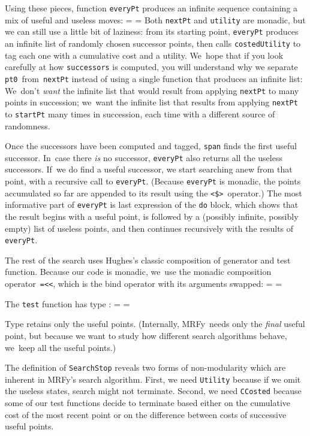 \documentclass[preprint,nonatbib,blockstyle,times]{sigplanconf}
\newcommand\mrfy{MRFy} %
\newif\ifverbatimsmall
\newcommand\smallverbatiminput[1]{%
  \verbatimsmalltrue
  \presvtopsep=\topsep
  \topsep=0.78\topsep
  \verbatimsmallfalse
  \topsep=\presvtopsep
}
\newcommand\smallfuzzverbatiminput[2]{%
  \hfuzz=#1 \smallverbatiminput{#2}\hfuzz=0pt }
\begin{document}
\noindent
\vbox{
Using these pieces, function \texttt{everyPt} produces an infinite
sequence containing a mix of useful and useless moves:
\smallfuzzverbatiminput{10.8pt}{everygen}
}
\noindent
Both \texttt{nextPt} and \texttt{utility} are monadic, but 
we can still use a little bit of
laziness:
from its starting point, \texttt{everyPt} produces an infinite list of
randomly chosen successor points, then calls \texttt{costedUtility} to
tag each one with a cumulative cost and a utility.
We~hope that if you look carefully at how \texttt{successors} is computed,
you will understand why we
separate \texttt{pt0}~from~\texttt{nextPt} instead of using a single
function that produces an infinite list:
We~don't \emph{want} the infinite list that would result from
applying \texttt{nextPt} to many points in succession;
we~want the infinite list that results from applying \texttt{nextPt}
to \texttt{startPt} many times in succession, each time with a
different source of randomness.

Once the successors have been computed and tagged,
\texttt{span} finds the first useful successor.
In~case there \emph{is} no successor, \texttt{everyPt} also returns
all the useless successors.
If~we do find a useful successor, we start searching anew from that
point, with a recursive call to \texttt{everyPt}.
(Because \texttt{everyPt} is monadic, the points accumulated so far are
appended to its result using the \verb+<$>+~operator.)
%
The most informative part of \texttt{everyPt} is last expression of
the \texttt{do} block,
which shows that the result begins with a useful point,
is followed by a (possibly infinite, possibly empty) list of useless
points, and then continues recursively with the results of \texttt{everyPt}.

The rest of the search uses Hughes's
classic composition of generator  and test function.
Because our code is monadic, we~use the monadic composition
operator~\texttt{=<<}, which is the bind operator with its arguments
swapped: 
\smallverbatiminput{search}
The \texttt{test} function has type :
\smallverbatiminput{stop}
Type  retains only the useful points.
(Internally, \mrfy\ needs only the \emph{final} useful point,
but because we want to study how different search algorithms behave,
we~keep all the useful points.)

The definition of \texttt{SearchStop} reveals two forms of
non-modularity which are inherent in \mrfy's search algorithm.
First, we need \texttt{Utility} because if we omit the useless states,
search might not terminate.
Second, we need \texttt{CCosted} because some of our test functions
decide to terminate based either on the cumulative cost of the most
recent point or on the difference between costs of successive useful points.
\end{document}
